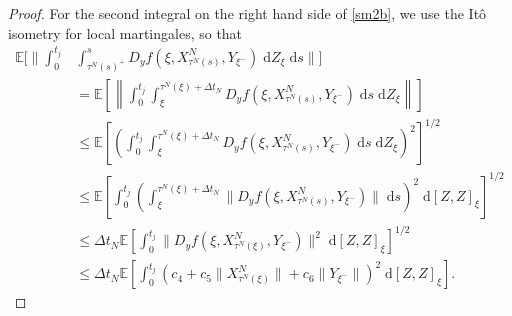\documentclass[reqno,12pt]{amsart}
\theoremstyle{plain} %
\theoremstyle{definition} %
\begin{document}
\begin{proof}
    For the second integral on the right hand side of \eqref{sm2b}, we use the It\^o isometry for local martingales, so that
    \begin{align*}
        \mathbb{E}\bigg[\bigg\|\int_0^{t_j} & \int_{\tau^N(s)^+}^s D_y f(\xi, X_{\tau^N(s)}^N, Y_{\xi^-}) \;\mathrm{d}Z_\xi\;\mathrm{d}s\bigg\|\bigg] \\
        & = \mathbb{E}\left[\left\|\int_0^{t_j} \int_{\xi}^{\tau^N(\xi) + \Delta t_N} D_y f(\xi, X_{\tau^N(s)}^N, Y_{\xi^-}) \;\mathrm{d}s \;\mathrm{d}Z_\xi\right\|\right] \\
        & \leq \mathbb{E}\left[\left(\int_0^{t_j} \int_{\xi}^{\tau^N(\xi) + \Delta t_N} D_y f(\xi, X_{\tau^N(s)}^N, Y_{\xi^-}) \;\mathrm{d}s \;\mathrm{d}Z_\xi\right)^2\right]^{1/2} \\
        & \leq \mathbb{E}\left[\int_0^{t_j} \left(\int_{\xi}^{\tau^N(\xi) + \Delta t_N} \|D_y f(\xi, X_{\tau^N(s)}^N, Y_{\xi^-})\| \;\mathrm{d}s\right)^2 \;\mathrm{d}[Z, Z]_\xi\right]^{1/2} \\
        & \leq \Delta t_N\mathbb{E}\left[\int_0^{t_j} \|D_y f(\xi, X_{\tau^N(\xi)}^N, Y_{\xi^-})\|^2 \;\mathrm{d}[Z, Z]_\xi\right]^{1/2} \\
        & \leq \Delta t_N\mathbb{E}\left[\int_0^{t_j} \left(c_4 + c_5\|X_{\tau^N(\xi)}^N\| + c_6 \|Y_{\xi^-}\| \right)^2\;\mathrm{d}[Z, Z]_\xi\right].
    \end{align*}


\end{proof}
\end{document}
